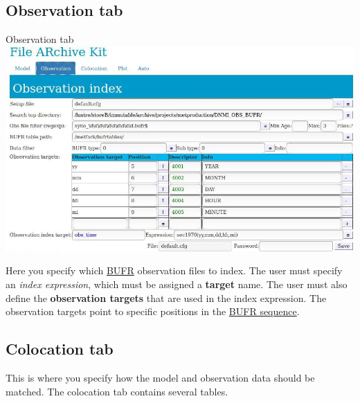 \documentclass[letterpaper,10pt,twoside,twocolumn,openany]{book}
\begin{document}
\subsection{Observation tab}
\begin{paperbox}{Observation tab}
  \includegraphics[width=\columnwidth]{fark_obs.jpg}
\end{paperbox}
Here you specify which \hyperlink{bufr}{BUFR} observation files to index.
The user must specify an {\em index expression}, which must be assigned a {\bf target} name. 
The user must also define the {\bf observation targets} that are used in the index expression. 
The observation targets point to specific positions in the \hyperlink{sequence}{BUFR sequence}.

\subsection{Colocation tab}
This is where you specify how the model and 
observation data should be matched.
The colocation tab contains several tables.
\end{document}
